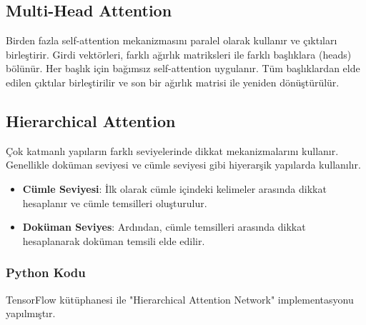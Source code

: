 \newpage

\subsection{Multi-Head Attention}
Birden fazla self-attention mekanizmasını paralel olarak kullanır ve çıktıları birleştirir. Girdi vektörleri, farklı ağırlık matriksleri ile farklı başlıklara (heads) bölünür. Her başlık için bağımsız self-attention uygulanır. Tüm başlıklardan elde edilen çıktılar birleştirilir ve son bir ağırlık matrisi ile yeniden dönüştürülür.

\newpage

\subsection{Hierarchical Attention}
Çok katmanlı yapıların farklı seviyelerinde dikkat mekanizmalarını kullanır. Genellikle doküman seviyesi ve cümle seviyesi gibi hiyerarşik yapılarda kullanılır.

\begin{itemize}
	\item \textbf{Cümle Seviyesi}: İlk olarak cümle içindeki kelimeler arasında dikkat hesaplanır ve cümle temsilleri oluşturulur.
	\item \textbf{Doküman Seviyes}: Ardından, cümle temsilleri arasında dikkat hesaplanarak doküman temsili elde edilir.
\end{itemize}

\subsubsection{Python Kodu}

TensorFlow kütüphanesi ile "Hierarchical Attention Network" implementasyonu yapılmıştır.

